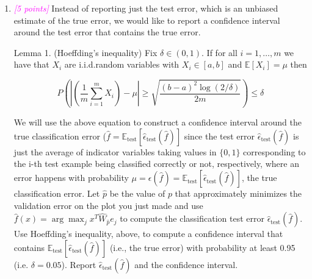 \documentclass{article}
\newcommand{\argmax}{\arg\!\max}
\newcommand{\1}{\mathbf{1}}
\newcommand{\E}{\mathbb{E}}
\newcommand{\points}[1]{\small\textcolor{magenta}{\emph{[#1 points]}} \normalsize}
\begin{document}
\begin{enumerate}
\begin{lstlisting}[language=Python]
            wHat = train(trainH, trainLabels, lambd)

            trainAcc, trainErr = calc_success_fraction(wHat, trainH, trainLabels)
            valAcc, valErr  = calc_success_fraction(wHat, valH,  valLabels)
            outfile.write(f"{p} {trainAcc} {trainErr} {valAcc} {valErr}\n")


def plotB2():
    """Plots B2Accuracy data, specifically the training and validation error
    columns, and displays the plot. 
    """
    data = np.loadtxt("B2Accuracy")

    ps = data[:, 0]
    testAcc = data[:, 1]
    testErr = data[:, 2]
    valAcc = data[:, 3]
    valErr = data[:, 4]

    plt.plot(ps, testErr, label="Test error")
    plt.plot(ps, valErr, label="Validation error")

    plt.xlabel("p")
    plt.ylabel("Classification Error")
    plt.legend()
    plt.show()

if __name__ == "__main__":
    #mainA6()
    mainB2()
    plotB2()
\end{lstlisting} 
    
    \newpage
    \item \points{5} Instead of reporting just the test error, which is an unbiased estimate of the true error, we would like to report a confidence interval around the test error that contains the true error. 
    
    Lemma 1. (Hoeffding’s inequality) Fix $\delta\in (0,1)$. If for all $i=1,\hdots,m$ we have that $X_i$ are i.i.d.random variables with $X_i\in [a,b]$ and $\E[X_i]=\mu$ then
    
    $$P\left(\left| \left(\frac{1}{m}\sum_{i=1}^m X_i\right) - \mu\right| \geq \sqrt{\frac{(b-a)^2 \log(2/\delta)}{2m}} \right) \leq \delta$$
    
    We will use the above equation to construct a confidence interval around the true classification error ($\hat f=\E_\text{test}[\widehat\epsilon_\text{test}(\hat f)]$ since the test error $\widehat\epsilon_\text{test}(\hat f)$ is just the average of indicator variables taking values in $\{0,1\}$ corresponding to the i-th test example being classified correctly or not, respectively, where an error happens with probability $\mu=\epsilon(\hat f)=\E_\text{test}[\widehat\epsilon_\text{test}(\hat f)]$, the true classification error. Let $\hat p$ be the value of $p$ that approximately minimizes the validation error on the plot you just made and use $\hat f(x) = \argmax_j x^T\widehat W_{\hat p} e_j$ to compute the classification test error $\widehat\epsilon_\text{test}(\hat f)$. Use Hoeffding’s inequality, above, to compute a confidence interval that contains $\E_\text{test}[\widehat\epsilon_\text{test}(\hat f)]$ (i.e., the true error) with probability at least 0.95 (i.e. $\delta=0.05$). Report $\widehat\epsilon_\text{test}(\hat f)$ and the confidence interval.
    

\end{enumerate}
\end{document}
